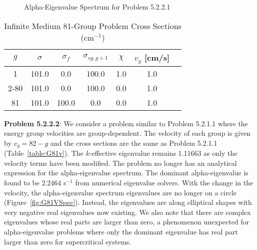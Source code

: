 \begin{figure}
\centering
	\resizebox{0.75\textwidth}{!}{
	}
\caption{Alpha-Eigenvalue Spectrum for Problem 5.2.2.1}
\label{fig:G81Spec}
\end{figure}

\begin{table}[!htbp]
    \centering
    \caption{Infinite Medium 81-Group Problem Cross Sections (cm$^{-1}$)}
\label{table:G81}
    \begin{tabular}{*7c}
        \toprule
	$g$ & $\sigma$ & $\sigma_{f}$ & $\sigma_{sg,g+1}$ & $\chi$ & $v_{g}$ [cm/s] \\ 
        \midrule
	1 & 101.0 & 0.0 & 100.0 & 1.0 & 1.0 \\
	2-80 & 101.0 & 0.0 & 100.0 & 0.0 & 1.0 \\
	81 & 101.0 & 100.0 & 0.0 & 0.0 & 1.0 \\
        \bottomrule
    \end{tabular}
\end{table}

\begin{table}[!htbp]
    \centering
    \caption{Transport Sweeps for Convergence for Problem 5.2.2.1}
\label{table:G81a}
\end{table}

\textbf{Problem 5.2.2.2}: We consider a problem similar to Problem 5.2.1.1 where the energy group velocities are group-dependent. The velocity of each group is given by $v_{g} = 82 - g$ and the cross sections are the same as Problem 5.2.1.1 (Table~\ref{table:G81v}). The $k$-effective eigenvalue remains 1.11663 as only the velocity terms have been modified. The problem no longer has an analytical expression for the alpha-eigenvalue spectrum. The dominant alpha-eigenvalue is found to be $2.2464$ s$^{-1}$ from numerical eigenvalue solvers. With the change in the velocity, the alpha-eigenvalue spectrum eigenvalues are no longer on a circle (Figure~\ref{fig:G81VSpec}). Instead, the eigenvalues are along elliptical shapes with very negative real eigenvalues now existing. We also note that there are complex eigenvalues whose real parts are larger than zero, a phenomenon unexpected for alpha-eigenvalue problems where only the dominant eigenvalue has real part larger than zero for supercritical systems.


